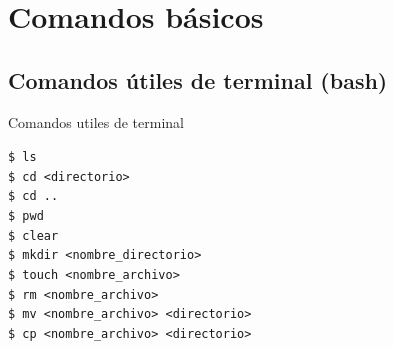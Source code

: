 \documentclass{beamer}
\begin{document}
 
  

\section{Comandos básicos}

\subsection {Comandos útiles de terminal (bash)}

\begin{frame}[containsverbatim]{Comandos utiles de terminal}

  \begin{block}{}
    \texttt{\$ ls \\
    \$ cd <directorio>  \\ 
    \$ cd .. \\ 
    \$ pwd \\
    \$ clear  \\ 
    \$ mkdir <nombre\_directorio> \\ 
    \$ touch <nombre\_archivo>\\ 
    \$ rm <nombre\_archivo> \\ 
    \$ mv <nombre\_archivo> <directorio> \\
    \$ cp <nombre\_archivo> <directorio>}
  \end{block}

\end{frame}
\end{document}
